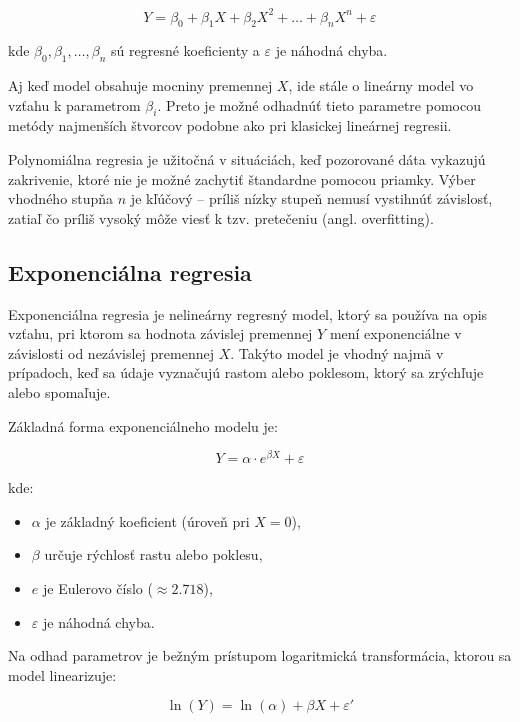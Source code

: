 \begin{equation}
Y = \beta_0 + \beta_1 X + \beta_2 X^2 + \dots + \beta_n X^n + \varepsilon
\end{equation}

kde $\beta_0, \beta_1, \dots, \beta_n$ sú regresné koeficienty a $\varepsilon$ je náhodná chyba.

Aj keď model obsahuje mocniny premennej $X$, ide stále o lineárny model vo vzťahu k parametrom $\beta_i$. Preto je možné odhadnúť tieto parametre pomocou metódy najmenších štvorcov podobne ako pri klasickej lineárnej regresii.

Polynomiálna regresia je užitočná v situáciách, keď pozorované dáta vykazujú zakrivenie, ktoré nie je možné zachytiť štandardne pomocou priamky. Výber vhodného stupňa $n$ je kľúčový – príliš nízky stupeň nemusí vystihnúť závislosť, zatiaľ čo príliš vysoký môže viesť k tzv. pretečeniu (angl. overfitting).

\subsection{Exponenciálna regresia}
\label{subsec:exponential_regression}

Exponenciálna regresia je nelineárny regresný model, ktorý sa používa na opis vzťahu, pri ktorom sa hodnota závislej premennej $Y$ mení exponenciálne v závislosti od nezávislej premennej $X$. Takýto model je vhodný najmä v prípadoch, keď sa údaje vyznačujú rastom alebo poklesom, ktorý sa zrýchľuje alebo spomaľuje.

Základná forma exponenciálneho modelu je:

\begin{equation}
Y = \alpha \cdot e^{\beta X} + \varepsilon
\end{equation}

kde:
\begin{itemize}
  \item $\alpha$ je základný koeficient (úroveň pri $X=0$),
  \item $\beta$ určuje rýchlosť rastu alebo poklesu,
  \item $e$ je Eulerovo číslo ($\approx 2.718$),
  \item $\varepsilon$ je náhodná chyba.
\end{itemize}

Na odhad parametrov je bežným prístupom logaritmická transformácia, ktorou sa model linearizuje:

\begin{equation}
\ln(Y) = \ln(\alpha) + \beta X + \varepsilon'
\end{equation}

